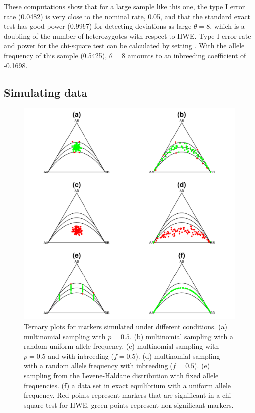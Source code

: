 \documentclass[nojss]{jss}
\begin{document}
%
These computations show that for a large sample like this one, the type I error rate (0.0482) is
very close to the nominal rate, 0.05, and that the standard exact test has good power (0.9997) for
detecting deviations as large $\theta=8$, which is a doubling of the number of heterozygotes with respect to HWE.
Type I error rate and power for the chi-square test
can be calculated by setting .
With the allele frequency of this sample (0.5425), $\theta=8$ amounts to an inbreeding 
coefficient of -0.1698.

\subsection{Simulating data}
\label{subsec:simulation}

\begin{figure}[p!]
\centering
\includegraphics[width=\textwidth, trim=40 10 40 10, clip]{Simulated2.pdf} 
\caption{Ternary plots for markers simulated under different
  conditions. (a) multinomial sampling with $p=0.5$.  (b) multinomial
  sampling with a random uniform allele frequency. (c) multinomial
  sampling with $p=0.5$ and with inbreeding ($f=0.5$). (d) multinomial
  sampling with a random allele frequency with inbreeding ($f=0.5$).
  (e) sampling from the Levene-Haldane distribution with fixed allele
  frequencies. (f) a data set in exact equilibrium with a uniform
  allele frequency. Red points represent markers that are significant
  in a chi-square test for HWE, green points represent non-significant
  markers.}\label{fig:simulated}
\end{figure}
\end{document}
